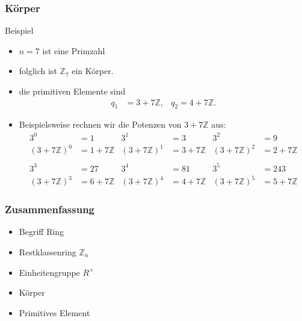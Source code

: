 \documentclass{beamer}
\newcommand\ZZ{\mathbb Z}
\renewcommand{\oe}{\"o}
\begin{document}
\begin{frame}\frametitle{K\oe rper}
	\begin{block}{Beispiel}
		\begin{itemize}
			\item $n=7$ ist eine Primzahl
			\item folglich ist $\ZZ_7$ ein K\oe rper.
			\item die primitiven Elemente sind
				\begin{align*}
					q_1&=3+7\ZZ,&q_2=4+7\ZZ.
				\end{align*}
			\item Beispielsweise rechnen wir die Potenzen von $3+7\ZZ$ aus:
				\begin{align*}
					3^0&=1&3^1&=3&3^2&=9\\
					(3+7\ZZ)^0&=1+7\ZZ& (3+7\ZZ)^1&=3+7\ZZ& (3+7\ZZ)^2&=2+7\ZZ\\\\
					3^3&=27&3^4&=81&3^5&=243\\
				(3+7\ZZ)^3&=6+7\ZZ& (3+7\ZZ)^4&=4+7\ZZ& (3+7\ZZ)^5&=5+7\ZZ \end{align*}
		\end{itemize}
	\end{block}
\end{frame}

\begin{frame}\frametitle{Zusammenfassung}
	\begin{itemize}
		\item Begriff Ring
		\item Restklassenring $\ZZ_n$
		\item Einheitengruppe $R^\times$
		\item K\oe rper
		\item Primitives Element
	\end{itemize}
\end{frame}
\end{document}
